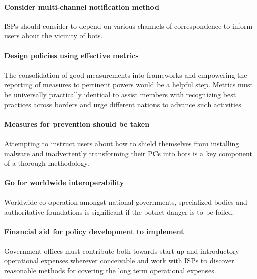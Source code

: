 \paragraph{Consider multi-channel notification method}

ISPs should consider to depend on various channels of correspondence to inform users about the vicinity of bots.

\paragraph{Design policies using effective metrics}

The consolidation of good measurements into frameworks and empowering the reporting of measures to pertinent powers would be a helpful step. Metrics must be universally practically identical to assist members with recognizing best practices across borders and urge different nations to advance such activities.

\paragraph{Measures for prevention should be taken}

Attempting to instruct users about how to shield themselves from installing malware and inadvertently transforming their PCs into bots is a key component of a thorough methodology.

\paragraph{Go for worldwide interoperability}

Worldwide co-operation amongst national governments, specialized bodies and authoritative foundations is significant if the botnet danger is to be foiled.

\paragraph{Financial aid for policy development to implement}

Government offices must contribute both towards start up and introductory operational expenses wherever conceivable and work with ISPs to discover reasonable methods for covering the long term operational expenses.


